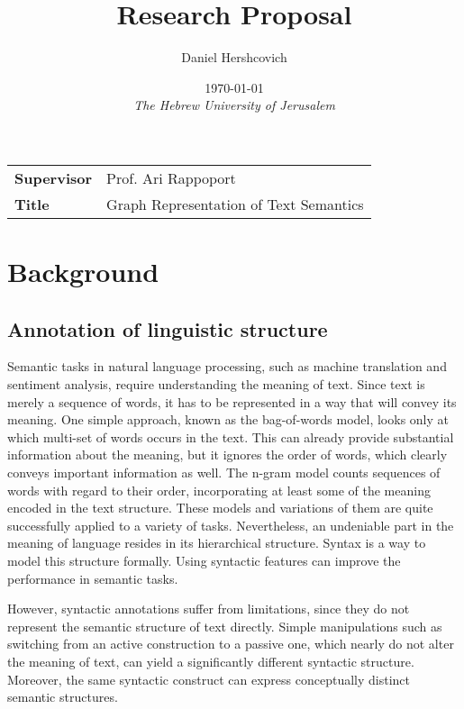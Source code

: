 \documentclass[11pt]{article}
\title{Research Proposal}
\author{Daniel Hershcovich}
\date{\today \\ \textit{The Hebrew University of Jerusalem}}
\begin{document}
\maketitle

\begin{table}[!th]
\begin{tabular}{>{\bfseries}l p{}}
Supervisor & Prof. Ari Rappoport \\
Title & Graph Representation of Text Semantics
\end{tabular}
\end{table}



\section{Background}

\subsection{Annotation of linguistic structure}

Semantic tasks in natural language processing, such as machine translation and sentiment analysis, require understanding the meaning of text. Since text is merely a sequence of words, it has to be represented in a way that will convey its meaning. One simple approach, known as the bag-of-words model, looks only at which multi-set of words occurs in the text. This can already provide substantial information about the meaning, but it ignores the order of words, which clearly conveys important information as well. The n-gram model counts sequences of words with regard to their order, incorporating at least some of the meaning encoded in the text structure. These models and variations of them are quite successfully applied to a variety of tasks\cite{mikolov2013efficient}. Nevertheless, an undeniable part in the meaning of language resides in its hierarchical structure. Syntax is a way to model this structure formally. Using syntactic features can improve the performance in semantic tasks\cite{vandeghinste2013parse}.

However, syntactic annotations suffer from limitations, since they do not represent the semantic structure of text directly. Simple manipulations such as switching from an active construction to a passive one, which nearly do not alter the meaning of text, can yield a significantly different syntactic structure. Moreover, the same syntactic construct can express conceptually distinct semantic structures\cite{abend2013ucca}.
\end{document}
